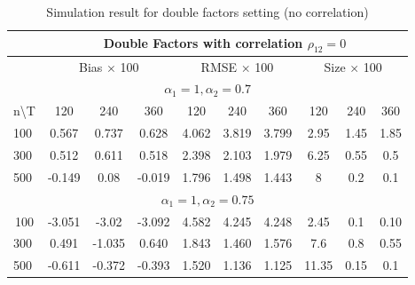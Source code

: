 \begin{table}[!hbt]
		\caption{Simulation result for double factors setting (no correlation)}\label{table:exp2}
	\centering
	\begin{tabular}{lccccccccc}
		\hline
		\hline
\multicolumn{1}{l|}{}                   & \multicolumn{9}{c}{Double Factors with correlation $\rho_{12} = 0$}                                                                \\ \hline
\multicolumn{1}{l|}{}                   & \multicolumn{3}{c|}{Bias $\times$ 100}        & \multicolumn{3}{c|}{RMSE $\times$ 100}      & \multicolumn{3}{c}{Size $\times$ 100} \\ \hline
\multicolumn{10}{c}{$\alpha_1 = 1, \alpha_2  = 0.7$}                                                                                                                           \\ \hline
\multicolumn{1}{l|}{n\textbackslash{}T} & 120    & 240    & \multicolumn{1}{c|}{360}    & 120    & 240   & \multicolumn{1}{c|}{360}   & 120         & 240        & 360         \\ \hline
\multicolumn{1}{l|}{100}                & 0.567  & 0.737  & \multicolumn{1}{c|}{0.628}  & 4.062  & 3.819 & \multicolumn{1}{c|}{3.799} & 2.95        & 1.45       & 1.85        \\
\multicolumn{1}{l|}{300}                & 0.512  & 0.611  & \multicolumn{1}{c|}{0.518}  & 2.398  & 2.103 & \multicolumn{1}{c|}{1.979} & 6.25        & 0.55       & 0.5         \\
\multicolumn{1}{l|}{500}                & -0.149 & 0.08   & \multicolumn{1}{c|}{-0.019} & 1.796  & 1.498 & \multicolumn{1}{c|}{1.443} & 8           & 0.2        & 0.1         \\ \hline
\multicolumn{10}{c}{$\alpha_1 = 1, \alpha_2 =0.75$}                                                                                                                              \\ \hline
\multicolumn{1}{c|}{100}                & -3.051 & -3.02  & \multicolumn{1}{c|}{-3.092} & 4.582  & 4.245 & \multicolumn{1}{c|}{4.248} & 2.45        & 0.1        & 0.10        \\
\multicolumn{1}{l|}{300}                & 0.491  & -1.035 & \multicolumn{1}{c|}{0.640}  & 1.843  & 1.460 & \multicolumn{1}{c|}{1.576} & 7.6         & 0.8        & 0.55        \\
\multicolumn{1}{l|}{500}                & -0.611 & -0.372 & \multicolumn{1}{c|}{-0.393} & 1.520  & 1.136 & \multicolumn{1}{c|}{1.125} & 11.35       & 0.15       & 0.1         \\ \hline

\end{tabular}
\end{table}

